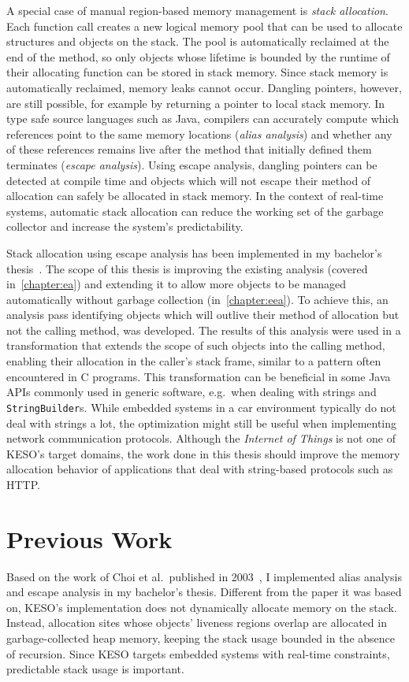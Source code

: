 		A special case of manual region-based memory management is \emph{stack allocation}. Each function call creates a new
		logical memory pool that can be used to allocate structures and objects on the stack. The pool is automatically
		reclaimed at the end of the method, so only objects whose lifetime is bounded by the runtime of their allocating
		function can be stored in stack memory. Since stack memory is automatically reclaimed, memory leaks cannot occur.
		Dangling pointers, however, are still possible, for example by returning a pointer to local stack memory. In type
		safe source languages such as Java, compilers can accurately compute which references point to the same memory
		locations (\emph{alias analysis}) and whether any of these references remains live after the method that initially
		defined them terminates (\emph{escape analysis}). Using escape analysis, dangling pointers can be detected at
		compile time and objects which will not escape their method of allocation can safely be allocated in stack memory.
		In the context of real-time systems, automatic stack allocation can reduce the working set of the garbage collector
		and increase the system's predictability.

		Stack allocation using escape analysis has been implemented in my bachelor's thesis~\cite{lang:12}. The scope of
		this thesis is improving the existing analysis (covered in~\cref{chapter:ea}) and extending it to allow more objects
		to be managed automatically without garbage collection (in~\cref{chapter:eea}). To achieve this, an analysis pass
		identifying objects which will outlive their method of allocation but not the calling method, was developed. The
		results of this analysis were used in a transformation that extends the scope of such objects into the calling
		method, enabling their allocation in the caller's stack frame, similar to a pattern often encountered in C programs.
		This transformation can be beneficial in some Java APIs commonly used in generic software, e.g.\ when dealing with
		strings and \texttt{StringBuilder}s. While embedded systems in a car environment typically do not deal with strings
		a lot, the optimization might still be useful when implementing network communication protocols. Although the
		\emph{Internet of Things} is not one of KESO's target domains, the work done in this thesis should improve the
		memory allocation behavior of applications that deal with string-based protocols such as HTTP.

	\section{Previous Work}
		\label{sec:intro:prev}
		Based on the work of Choi et al.\ published in 2003~\cite{choi:03:toplas}, I implemented alias analysis and escape
		analysis in my bachelor's thesis. Different from the paper it was based on, KESO's implementation does not
		dynamically allocate memory on the stack. Instead, allocation sites whose objects' liveness regions overlap are
		allocated in garbage-collected heap memory, keeping the stack usage bounded in the absence of recursion. Since KESO
		targets embedded systems with real-time constraints, predictable stack usage is important.

